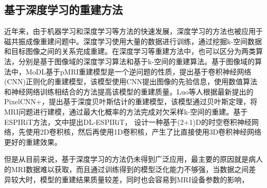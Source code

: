 \documentclass[lang=cn,11pt,a4paper,cite=numbers]{elegantpaper}
\begin{document}
\subsection{基于深度学习的重建方法}
\par 近年来，由于机器学习和深度学习等方法的快速发展，深度学习的方法也被应用于磁共振成像重建问题中。深度学习使用大量的数据进行训练，通过挖掘k-空间数据和目标图像之间的关系完成重建。在深度学习等重建方法中，也可以区分为两类算法，分别是基于图像域的深度学习算法和基于k-空间的重建算法。基于图像域的算法中，MoDL\cite{aggarwal2018modl}基于pMRI重建模型是一个逆问题的性质，提出基于卷积神经网络(CNN)正则化的重建模型，该模型使用CNN提出图像的先验信息，使用数值算法和神经网络训练相结合的方法提高该模型的重建质量。Luo等人根据最新提出的PixelCNN+\cite{salimans2017pixelcnn++}，提出基于深度贝叶斯估计的重建模型\cite{luo2020mri}，该模型通过贝叶斯定理，将MRI问题进行建模，通过最大化概率的方法完成对欠采样k-空间的重建。基于ESPIRiT方法，文\cite{sandino2021accelerating}中提出DL-ESPIRiT， 设计一种基于(2+1)D的时空卷积神经网络，先使用2D卷积核，然后再使用1D卷积核，产生了比直接使用3D卷积神经网络更好的重建效果。
\par 但是从目前来说，基于深度学习的方法仍未得到广泛应用，最主要的原因就是病人的MRI数据难以获取，而且通过训练得到的模型泛化能力不够强，当数据之间差异较大时，模型的重建结果质量较差，同时也会容易到MRI设备参数的影响，

\newpage


\end{document}
